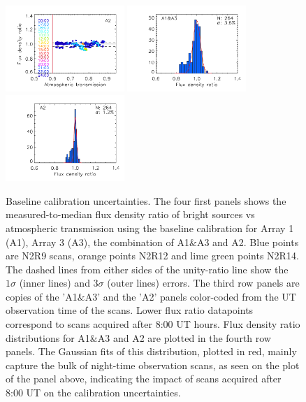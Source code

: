 \begin{figure}[ht!]
\begin{center}
    \includegraphics[clip=true, trim={0.9cm, 0.2cm, 0, 0.6cm},width=0.4\textwidth]{Figures/Calibration/plot_flux_density_ratio_obstau_allbright_obsdate_corrected_skydip_narrow_a2.pdf}
    \includegraphics[clip=true, trim={0.9cm, 0.2cm, 0, 0.6cm},width=0.4\textwidth]{Figures/Calibration/plot_histo_flux_density_ratio_obstau_allbright_corrected_skydip_narrow_1mm.pdf}
    \includegraphics[clip=true, trim={0.9cm, 0.2cm, 0, 0.6cm},width=0.4\textwidth]{Figures/Calibration/plot_histo_flux_density_ratio_obstau_allbright_corrected_skydip_narrow_a2.pdf}  
    \caption[Baseline calibration rms error estimate]{Baseline
      calibration uncertainties. The four first panels shows the
      measured-to-median flux density ratio of bright sources vs
      atmospheric transmission using the baseline calibration for
      Array 1 (A1), Array 3 (A3), the combination of A1$\&$A3 and
      A2. Blue points are N2R9 scans, orange points N2R12 and lime
      green points N2R14. The dashed lines from either sides of the
      unity-ratio line
      show the $1\sigma$ (inner lines) and $3\sigma$ (outer lines) errors.
      The third row panels are copies of the 'A1$\&$A3' and the
      'A2' panels color-coded from the UT observation time of the
      scans. Lower flux ratio datapoints correspond to
      scans acquired after 8:00 UT hours. Flux density ratio
      distributions for A1$\&$A3 and A2 are plotted in the fourth row
      panels. The Gaussian fits of this distribution, plotted in red,
      mainly capture the bulk of night-time observation scans, as seen
      on the plot of the panel above, %
       indicating the
      impact of scans acquired after 8:00 UT on the calibration
      uncertainties.}
    \label{fig:allbright_rms_corrected_skydip}
  \end{center}
\end{figure}

